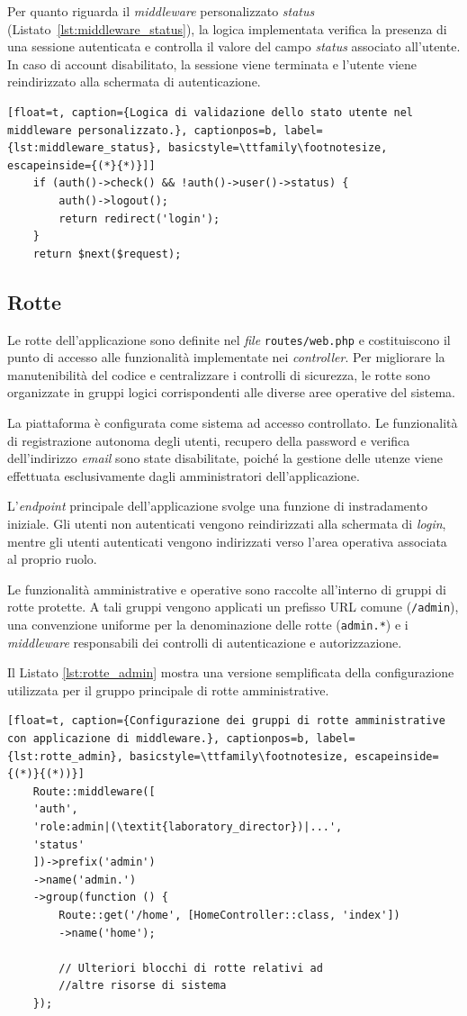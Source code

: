 Per quanto riguarda il \textit{middleware} personalizzato \textit{status} (Listato~\ref{lst:middleware_status}), la logica implementata verifica la presenza di una sessione autenticata e controlla il valore del campo \textit{status} associato all'utente. In caso di account disabilitato, la sessione viene terminata e l'utente viene reindirizzato alla schermata di autenticazione.
\begin{lstlisting}[float=t, caption={Logica di validazione dello stato utente nel middleware personalizzato.}, captionpos=b, label={lst:middleware_status}, basicstyle=\ttfamily\footnotesize, escapeinside={(*}{*)}]]
	if (auth()->check() && !auth()->user()->status) {
		auth()->logout();
		return redirect('login');
	}
	return $next($request);
\end{lstlisting}

\subsection{Rotte}
Le rotte dell'applicazione sono definite nel \textit{file} \texttt{routes/web.php} e costituiscono il punto di accesso alle funzionalità implementate nei \textit{controller}. Per migliorare la manutenibilità del codice e centralizzare i controlli di sicurezza, le rotte sono organizzate in gruppi logici corrispondenti alle diverse aree operative del sistema.

La piattaforma è configurata come sistema ad accesso controllato. Le funzionalità di registrazione autonoma degli utenti, recupero della password e verifica dell'indirizzo \textit{email} sono state disabilitate, poiché la gestione delle utenze viene effettuata esclusivamente dagli amministratori dell'applicazione.

L'\textit{endpoint} principale dell'applicazione svolge una funzione di instradamento iniziale. Gli utenti non autenticati vengono reindirizzati alla schermata di \textit{login}, mentre gli utenti autenticati vengono indirizzati verso l'area operativa associata al proprio ruolo.

Le funzionalità amministrative e operative sono raccolte all'interno di gruppi di rotte protette. A tali gruppi vengono applicati un prefisso URL comune (\texttt{/admin}), una convenzione uniforme per la denominazione delle rotte (\texttt{admin.*}) e i \textit{middleware} responsabili dei controlli di autenticazione e autorizzazione.

Il Listato \ref{lst:rotte_admin} mostra una versione semplificata della configurazione utilizzata per il gruppo principale di rotte amministrative.
\begin{lstlisting}[float=t, caption={Configurazione dei gruppi di rotte amministrative con applicazione di middleware.}, captionpos=b, label={lst:rotte_admin}, basicstyle=\ttfamily\footnotesize, escapeinside={(*)}{(*))}]
	Route::middleware([
	'auth',
	'role:admin|(\textit{laboratory_director})|...',
	'status'
	])->prefix('admin')
	->name('admin.')
	->group(function () {
		Route::get('/home', [HomeController::class, 'index'])
		->name('home');
		
		// Ulteriori blocchi di rotte relativi ad 
		//altre risorse di sistema
	});
\end{lstlisting}
